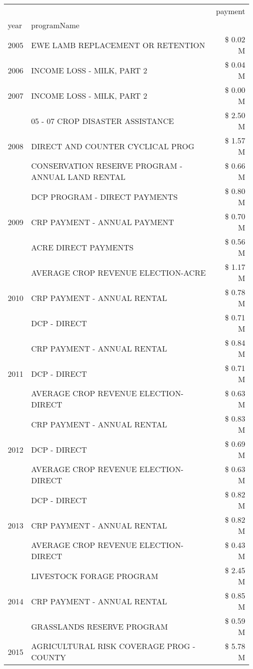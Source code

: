\begin{tabular}{llr}
\toprule
 &  & payment \\
year & programName &  \\
\midrule
2005 & EWE LAMB REPLACEMENT OR RETENTION & \$ 0.02 M \\
\cline{1-3}
2006 & INCOME LOSS - MILK, PART 2 & \$ 0.04 M \\
\cline{1-3}
2007 & INCOME LOSS - MILK, PART 2 & \$ 0.00 M \\
\cline{1-3}
\multirow[t]{3}{*}{2008} & 05 - 07 CROP DISASTER ASSISTANCE & \$ 2.50 M \\
 & DIRECT AND COUNTER CYCLICAL PROG & \$ 1.57 M \\
 & CONSERVATION RESERVE PROGRAM - ANNUAL LAND RENTAL & \$ 0.66 M \\
\cline{1-3}
\multirow[t]{3}{*}{2009} & DCP PROGRAM - DIRECT PAYMENTS & \$ 0.80 M \\
 & CRP PAYMENT - ANNUAL PAYMENT & \$ 0.70 M \\
 & ACRE DIRECT PAYMENTS & \$ 0.56 M \\
\cline{1-3}
\multirow[t]{3}{*}{2010} & AVERAGE CROP REVENUE ELECTION-ACRE & \$ 1.17 M \\
 & CRP PAYMENT - ANNUAL RENTAL & \$ 0.78 M \\
 & DCP - DIRECT & \$ 0.71 M \\
\cline{1-3}
\multirow[t]{3}{*}{2011} & CRP PAYMENT - ANNUAL RENTAL & \$ 0.84 M \\
 & DCP - DIRECT & \$ 0.71 M \\
 & AVERAGE CROP REVENUE ELECTION-DIRECT & \$ 0.63 M \\
\cline{1-3}
\multirow[t]{3}{*}{2012} & CRP PAYMENT - ANNUAL RENTAL & \$ 0.83 M \\
 & DCP - DIRECT & \$ 0.69 M \\
 & AVERAGE CROP REVENUE ELECTION-DIRECT & \$ 0.63 M \\
\cline{1-3}
\multirow[t]{3}{*}{2013} & DCP - DIRECT & \$ 0.82 M \\
 & CRP PAYMENT - ANNUAL RENTAL & \$ 0.82 M \\
 & AVERAGE CROP REVENUE ELECTION-DIRECT & \$ 0.43 M \\
\cline{1-3}
\multirow[t]{3}{*}{2014} & LIVESTOCK FORAGE PROGRAM & \$ 2.45 M \\
 & CRP PAYMENT - ANNUAL RENTAL & \$ 0.85 M \\
 & GRASSLANDS RESERVE PROGRAM & \$ 0.59 M \\
\cline{1-3}
\multirow[t]{3}{*}{2015} & AGRICULTURAL RISK COVERAGE PROG - COUNTY & \$ 5.78 M \\

\end{tabular}
